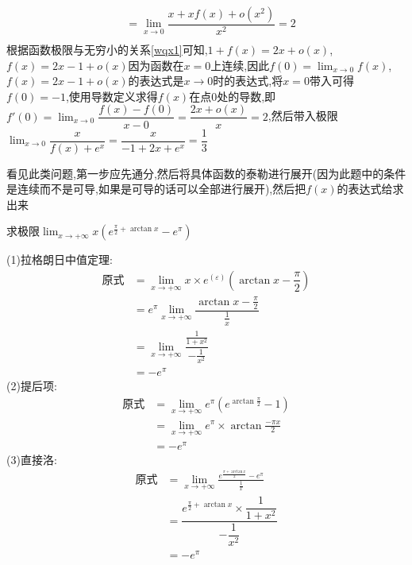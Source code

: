 \documentclass[8pt a4paper, oneside, UTF8]{ctexbook}
\begin{document}
\begin{sloppypar}
\begin{solution}
\begin{equation*}
\begin{split}
                & = \lim_{x \to 0}\dfrac{x+xf(x)+o(x^2)}{x^2}=2 \\
            \end{split}
        \end{equation*} 
    根据函数极限与无穷小的关系\ref{wqx1}可知,$1+f(x)=2x+o(x)$,$f(x)=2x-1+o(x)$因为函数在$x=0$上连续,因此$f(0)=\lim_{x\to 0}f(x)$,$f(x)=2x-1+o(x)$的表达式是$x\to 0$时的表达式,将$x=0$带入可得$f(0)=-1$,使用导数定义求得$f(x)$在点0处的导数,即$f'(0)=\lim_{x \to 0}\dfrac{f(x)-f(0)}{x-0}=\dfrac{2x+o(x)}{x}=2$,然后带入极限$\lim_{x\to 0}\dfrac{x}{f(x)+e^x}=\dfrac{x}{-1+2x+e^x}=\dfrac{1}{3}$
    \end{solution}
    \begin{note}
        看见此类问题,第一步应先通分,然后将具体函数的泰勒进行展开(因为此题中的条件是连续而不是可导,如果是可导的话可以全部进行展开),然后把$f(x)$的表达式给求出来
    \end{note}
    \begin{problem}
        求极限$\lim_{x\to +\infty}x(e^{\frac{\pi}{2}+\arctan x}-e^\pi)$
    \end{problem}
    \begin{solution}
        (1)拉格朗日中值定理:
        \begin{align*}
            \text{原式} & = \lim_{x\to +\infty}x\times e^{(\varepsilon)}(\arctan x -\dfrac{\pi}{2})\\
            & = e^{\pi} \lim_{x\to +\infty}\dfrac{\arctan x -\frac{\pi}{2}}{\frac1x}\\
            & =\lim_{x\to +\infty} \dfrac{\frac{1}{1+x^2}}{-\frac{1}{x^2}}\\
            & =-e^\pi 
        \end{align*}
        (2)提后项:
        \begin{align*}
            \text{原式} & = \lim_{x\to +\infty}e^\pi(e^{\arctan \frac{\pi}{2}}-1)\\
            & =\lim_{x\to +\infty}e^\pi\times\arctan \frac{-\pi x}{2}\\
            & =-e^\pi
        \end{align*}
        (3)直接洛:
        \begin{align*}
          \text{原式} & = \lim_{x\to +\infty}\frac{e^{\frac{\pi+\arctan x}{2}}-e^\pi}{\frac{1}{x}} \\
          & = \dfrac{e^{\frac{\pi}{2}+\arctan x}\times\dfrac{1}{1+x^{2}}}{-\dfrac{1}{x^{2}}} \\
          & = -e^\pi
        \end{align*}

\end{solution}
\end{sloppypar}
\end{document}
